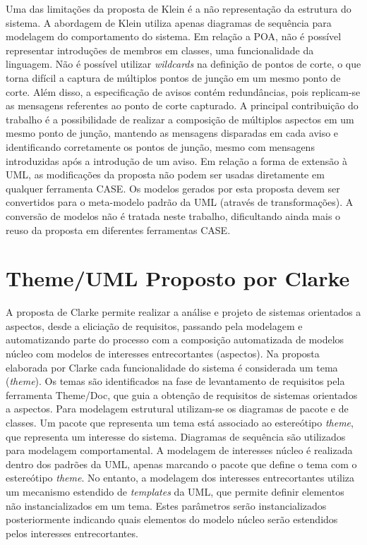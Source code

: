 Uma das limitações da proposta de Klein é a não representação da estrutura do sistema. A abordagem de Klein utiliza apenas diagramas de sequência para
modelagem do comportamento do sistema. Em relação a POA, não é possível representar introduções de membros em classes, uma funcionalidade da
linguagem. Não é possível utilizar \textit{wildcards} na definição de pontos de corte, o que torna difícil a captura de múltiplos pontos de junção em um mesmo ponto de corte. Além disso, a especificação de avisos contém redundâncias, pois replicam-se as mensagens referentes ao ponto de corte
capturado. A principal contribuição do trabalho é a possibilidade de realizar a composição de múltiplos aspectos em um mesmo ponto de junção, mantendo
as mensagens disparadas em cada aviso e identificando corretamente os pontos de junção, mesmo com mensagens introduzidas após a introdução de um
aviso. Em relação a forma de extensão à UML, as modificações da proposta não podem ser usadas diretamente em qualquer ferramenta CASE. Os modelos
gerados por esta proposta devem ser convertidos para o meta-modelo padrão da UML (através de transformações). A conversão de modelos não é tratada
neste trabalho, dificultando ainda mais o reuso da proposta em diferentes ferramentas CASE.

\section{Theme/UML Proposto por Clarke}

A proposta de Clarke \cite{clarke:04} permite realizar a análise e projeto de sistemas orientados a aspectos, desde a eliciação de requisitos,
passando pela modelagem e automatizando parte do processo com a composição automatizada de modelos núcleo com modelos de interesses entrecortantes
(aspectos). Na proposta elaborada por Clarke cada funcionalidade do sistema é considerada um tema (\textit{theme}). Os temas são identificados na fase
de levantamento de requisitos pela ferramenta Theme/Doc, que guia a obtenção de requisitos de sistemas orientados a aspectos. Para modelagem
estrutural utilizam-se os diagramas de pacote e de classes. Um pacote que representa um tema está associado ao estereótipo \textit{theme}, 
que representa um interesse do sistema. Diagramas de sequência são utilizados para modelagem comportamental. A modelagem de interesses
núcleo é realizada dentro dos padrões da UML, apenas marcando o pacote que define o tema com o estereótipo \textit{theme}. No entanto, a modelagem dos
interesses entrecortantes utiliza um mecanismo estendido de \textit{templates} da UML, que permite definir elementos não instancializados em um tema. 
Estes parâmetros serão instancializados posteriormente indicando quais elementos do modelo núcleo serão estendidos pelos interesses
entrecortantes. 

